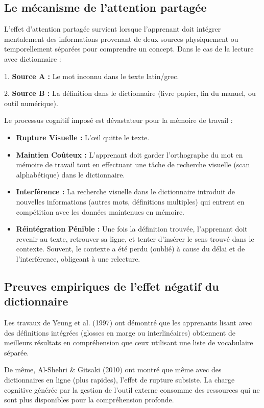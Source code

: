 \subsection{Le mécanisme de l'attention partagée}

L'effet d'attention partagée survient lorsque l'apprenant doit intégrer mentalement des informations
provenant de deux sources physiquement ou temporellement séparées pour comprendre un
concept.\cite{II-1-3-ref19} Dans le cas de la lecture avec dictionnaire :

1. \textbf{Source A :} Le mot inconnu dans le texte latin/grec.

2. \textbf{Source B :} La définition dans le dictionnaire (livre papier, fin du manuel, ou outil
numérique).

Le processus cognitif imposé est dévastateur pour la mémoire de travail :

\begin{itemize}\item \textbf{Rupture Visuelle :} L'œil quitte le texte.\item \textbf{Maintien Coûteux :} L'apprenant doit garder l'orthographe du mot en mémoire de travail tout en effectuant une tâche de recherche visuelle (scan alphabétique) dans le dictionnaire.\item \textbf{Interférence :} La recherche visuelle dans le dictionnaire introduit de nouvelles informations (autres mots, définitions multiples) qui entrent en compétition avec les données maintenues en mémoire.\cite{II-1-3-ref20}\item \textbf{Réintégration Pénible :} Une fois la définition trouvée, l'apprenant doit revenir au texte, retrouver sa ligne, et tenter d'insérer le sens trouvé dans le contexte. Souvent, le contexte a été perdu (oublié) à cause du délai et de l'interférence, obligeant à une relecture.\cite{II-1-3-ref21}\end{itemize}

\subsection{Preuves empiriques de l'effet négatif du dictionnaire}

Les travaux de Yeung et al. (1997) ont démontré que les apprenants lisant avec des définitions
intégrées (glosses en marge ou interlinéaires) obtiennent de meilleurs résultats en compréhension
que ceux utilisant une liste de vocabulaire séparée.\cite{II-1-3-ref22}

De même, Al-Shehri \& Gitsaki (2010) ont montré que même avec des dictionnaires en ligne (plus
rapides), l'effet de rupture subsiste. La charge cognitive générée par la gestion de l'outil externe
consomme des ressources qui ne sont plus disponibles pour la compréhension
profonde.\cite{II-1-3-ref23}

